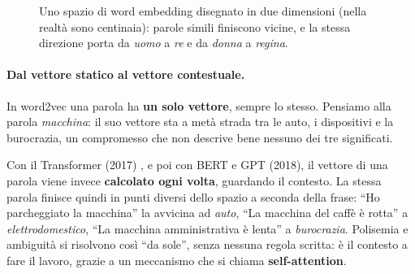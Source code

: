 \begin{figure}[htbp]
\centering
{}
\caption{Uno spazio di word embedding disegnato in due dimensioni (nella realtà sono centinaia): parole simili finiscono vicine, e la stessa direzione porta da \textit{uomo} a \textit{re} e da \textit{donna} a \textit{regina}.}
\label{fig:embedding}
\end{figure}

\paragraph{Dal vettore statico al vettore contestuale.} In word2vec una parola ha \textbf{un solo vettore}, sempre lo stesso. Pensiamo alla parola \textit{macchina}: il suo vettore sta a metà strada tra le auto, i dispositivi e la burocrazia, un compromesso che non descrive bene nessuno dei tre significati.

Con il Transformer (2017) \cite{vaswani2017attention}, e poi con BERT e GPT (2018), il vettore di una parola viene invece \textbf{calcolato ogni volta}, guardando il contesto. La stessa parola finisce quindi in punti diversi dello spazio a seconda della frase: \enquote{Ho parcheggiato la macchina} la avvicina ad \textit{auto}, \enquote{La macchina del caffè è rotta} a \textit{elettrodomestico}, \enquote{La macchina amministrativa è lenta} a \textit{burocrazia}. Polisemia e ambiguità si risolvono così \enquote{da sole}, senza nessuna regola scritta: è il contesto a fare il lavoro, grazie a un meccanismo che si chiama \textbf{self-attention}.

